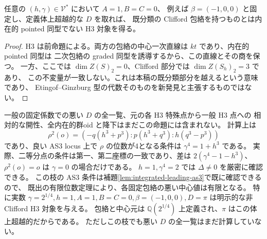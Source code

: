 \begin{corollary}[既分類Clifford部分の外のH3対象]
任意の $(h,\gamma)\in\mathcal V^*$ において $A=1,B=C=0$、
例えば $\beta=(-1,0,0)$ と固定し、定義体上超越的な $D$ を取れば、
既分類の Clifford 包絡を持つものとは内在的 pointed 同型でない H3 対象を得る。
\end{corollary}
\begin{proof}
H3 は前命題による。両方の包絡の中心一次直線は $kt$ であり、内在的 pointed 同型は
二次包絡の graded 同型を誘導するから、この直線とその商を保つ。
一方、ここでは $\dim Z(S)_2=0$、Clifford 部分では $\dim Z(S_h)_2=3$ であり、
この不変量が一致しない。これは本稿の既分類部分を越えるという意味であり、
Etingof--Ginzburg 型の代数そのものを新発見と主張するものではない。
\end{proof}

\begin{remark}[未解決部分と有限位数の具体的な次の枝]
一般の固定係数での悪い $D$ の全一覧、元の各 H3 特殊点から一般 H3 点への
相対的な開性、全内在的群oid と降下はまだこの命題には含まれない。
計算上は
\[
 \rho^2(o)=(-q(h^3+p^3):p(h^3+q^3):h(q^3-p^3))
\]
であり、良い AS3 locus 上で $\rho$ の位数が4となる条件は
$\gamma^4=1+h^3$ である。
実際、二等分点の条件は第一、第二座標の一致であり、差は
$2(\gamma^4-1-h^3)$、$\rho^2(o)=o$ は $\gamma=0$ の場合だけである。
$h=1,\gamma^4=2$ では $\Delta\ne0$ を厳密に確認できる。
この枝の AS3 条件は補題\ref{lem:integrated-leading-as3}で既に確認できるので、
既出の有限位数定理により、各固定包絡の悪い中心値は有限となる。
特に実数 $\gamma=2^{1/4},h=1,A=1,B=C=0,\beta=(-1,0,0),D=\pi$
は明示的な非Clifford H3 対象を与える。
包絡と中心元は $\mathbb Q(2^{1/4})$ 上定義され、$\pi$ はこの体上超越的だからである。
ただしこの枝でも悪い $D$ の全一覧はまだ計算していない。
\end{remark}
